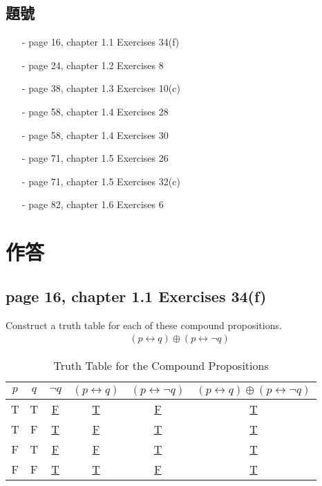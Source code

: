 \documentclass[sigconf]{acmart}
\begin{document}
\subsection{題號}
\begin{shaded}
\begin{itemize}
    \item[-] page 16, chapter 1.1 Exercises 34(f)
    \item[-] page 24, chapter 1.2 Exercises 8
    \item[-] page 38, chapter 1.3 Exercises 10(c)
    \item[-] page 58, chapter 1.4 Exercises 28
    \item[-] page 58, chapter 1.4 Exercises 30
    \item[-] page 71, chapter 1.5 Exercises 26
    \item[-] page 71, chapter 1.5 Exercises 32(c)
    \item[-] page 82, chapter 1.6 Exercises 6
\end{itemize}
\end{shaded}

\section{作答}

\subsection{page 16, chapter 1.1 Exercises 34(f)}
\begin{shaded}
    Construct a truth table for each of these compound propositions.
    \begin{eqnarray*}
    	(p \leftrightarrow q) \oplus (p \leftrightarrow \neg q)
    \end{eqnarray*}
\end{shaded}  
\begin{table}[h]
	\centering
	\caption{Truth Table for the Compound Propositions}
	\label{t1}
	\begin{tabular}{c|c|c|c|c|c}
    	\hline
    	 $p$ & $q$ & $\neg q$ & $(p \leftrightarrow q)$ & $(p \leftrightarrow \neg q)$ & $ (p \leftrightarrow q) \oplus (p \leftrightarrow \neg q)$  \\ \hline
    	 T  & T & \underline{F} & \underline{T} & \underline{F} & \underline{T} \\ 
    	 T  & F & \underline{T} & \underline{F} & \underline{T} & \underline{T} \\ 
    	 F  & T & \underline{F} & \underline{F} & \underline{T} & \underline{T} \\ 
    	 F  & F & \underline{T} & \underline{T} & \underline{F} & \underline{T} \\ 
    	\hline
	\end{tabular}
\end{table}
\end{document}
